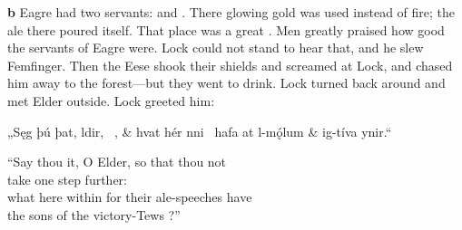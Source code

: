 \textbf{b} Eagre had two servants:  and . There glowing gold was used instead of fire; the ale there poured itself. That place was a great . Men greatly praised how good the servants of Eagre were. Lock could not stand to hear that, and he slew Femfinger. Then the Eese shook their shields and screamed at Lock, and chased him away to the forest—but they went to drink. Lock turned back around and met Elder outside. Lock greeted him:\epb\epg

\sectionline

\bvg\bva „Sęg þú þat, ldir, \hld\ , &
hvat hér nni \hld\ hafa at l-mǫ́lum &
\ind {}ig-tíva ynir.“\eva

\bvb “Say thou it, O Elder, so that thou not \\
take one step further: \\
what here within for their ale-speeches have \\
the sons of the victory-Tews ?”\evb\evg


